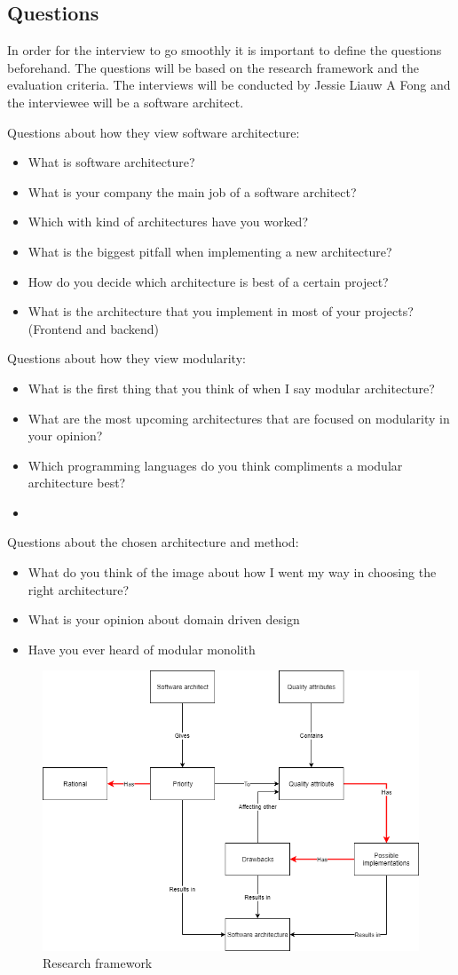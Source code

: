 \subsection{Questions}

In order for the interview to go smoothly it is important to define the questions beforehand. The questions will be based on the research framework and the evaluation criteria. The interviews will be conducted by Jessie Liauw A Fong and the interviewee will be a software architect.

Questions about how they view software architecture:
\begin{itemize}
  \item What is software architecture?
  \item What is your company the main job of a software architect?
  \item Which with kind of architectures have you worked?
  \item What is the biggest pitfall when implementing a new architecture?
  \item How do you decide which architecture is best of a certain project?
  \item What is the architecture that you implement in most of your projects? (Frontend and backend)
\end{itemize}

Questions about how they view modularity:
\begin{itemize}
  \item What is the first thing that you think of when I say modular architecture?
  \item What are the most upcoming architectures that are focused on modularity in your opinion?
  \item Which programming languages do you think compliments a modular architecture best?
  \item
\end{itemize}

Questions about the chosen architecture and method:
\begin{itemize}
  \item What do you think of the image about how I went my way in choosing the right architecture?
  \item What is your opinion about domain driven design
  \item Have you ever heard of modular monolith
\end{itemize}

\begin{figure}[H]
	\includegraphics[width=\linewidth]{creating_architecture.png}
	\caption{Research framework}
\end{figure}
